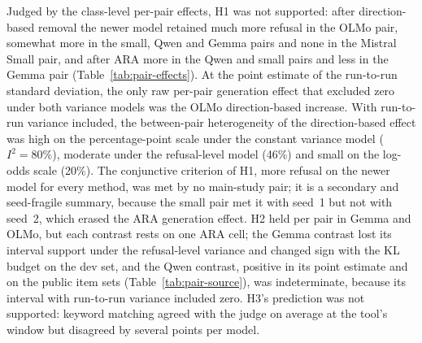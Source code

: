 Judged by the class-level per-pair effects, H1 was not supported: after
direction-based removal the newer model retained much more refusal in the
OLMo pair, somewhat more in the small, Qwen and Gemma pairs and none in the
Mistral Small pair, and after ARA more in the Qwen and small pairs and less in
the Gemma pair (Table~\ref{tab:pair-effects}). At the point estimate of the
run-to-run standard deviation, the only raw per-pair generation effect that
excluded zero under both variance models was the OLMo direction-based
increase. With run-to-run variance included, the between-pair heterogeneity
of the direction-based effect was high on the percentage-point scale under
the constant variance model ($I^2=80\%$), moderate under the refusal-level
model (46\%) and small on the log-odds scale (20\%). The conjunctive
criterion of H1, more refusal on the newer model for every method, was met by
no main-study pair; it is a secondary and seed-fragile summary, because the
small pair met it with seed~1 but not with seed~2, which erased the ARA
generation effect. H2 held per pair in Gemma and OLMo, but each contrast rests
on one ARA cell; the Gemma contrast lost its interval support under the
refusal-level variance and changed sign with the KL budget on the dev set,
and the Qwen contrast, positive in its point estimate and on the public item
sets (Table~\ref{tab:pair-source}), was indeterminate, because its interval
with run-to-run variance included zero. H3's prediction was not supported:
keyword matching agreed with the judge on average at the tool's window but
disagreed by several points per model.

